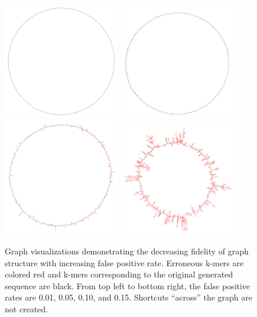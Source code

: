 \documentclass{pnastwo}
\begin{document}
\clearpage

\begin{figure}
\includegraphics[width=2in]{f3b001}
\includegraphics[width=2in]{f3b005}
\includegraphics[width=2in]{f3b010}
\includegraphics[width=2in]{f3b015}

\caption{Graph visualizations demonstrating the decreasing fidelity of
  graph structure with increasing false positive rate. Erroneous k-mers are 
  colored red and k-mers corresponding to the original generated sequence 
  are black. From top left
  to bottom right, the false positive rates are 0.01, 0.05, 0.10, and
  0.15.  Shortcuts ``across'' the graph are not created.}

\label{fig:circles}
\end{figure}
\end{document}

